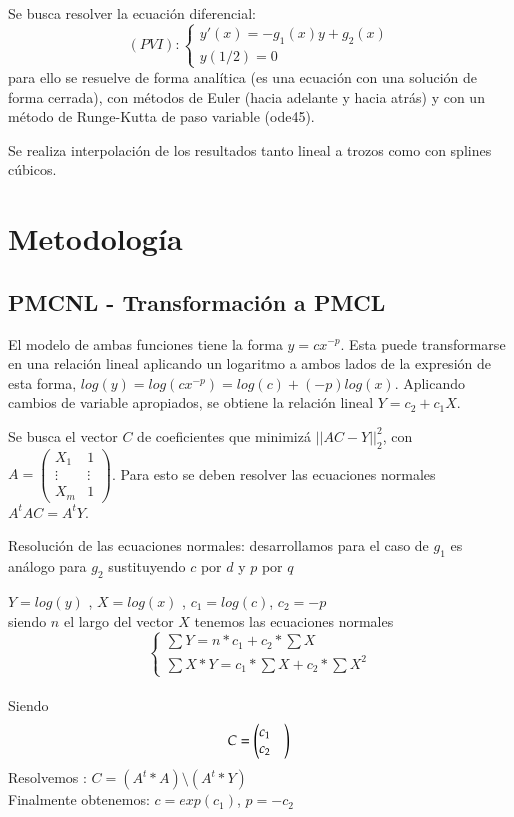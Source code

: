 \documentclass{endm}
\begin{document}
Se busca resolver la ecuación diferencial:
\begin{equation*}
    (PVI):\begin{cases}
        y'(x) = -g_1(x)y + g_2(x) \\
        y(1/2) = 0
    \end{cases}
\end{equation*}
para ello se resuelve de forma analítica (es una ecuación con una solución de forma cerrada), con métodos de Euler (hacia adelante y hacia atrás) y con un método de Runge-Kutta de paso variable (ode45).

Se realiza interpolación de los resultados tanto lineal a trozos como con splines cúbicos.
\section{Metodología}\label{AA}

\subsection{PMCNL - Transformación a PMCL}
El modelo de ambas funciones tiene la forma $y = cx^{-p}$. Esta puede transformarse en una relación
lineal aplicando un logaritmo a ambos lados de la expresión de esta forma, $log(y) = log(cx^{-p}) = log(c) + (-p)log(x)$.
Aplicando cambios de variable apropiados, se obtiene la relación lineal $Y = c_2 + c_1X$.

Se busca el vector $C$ de coeficientes que minimizá $||AC - Y||^2_2$,
con $A = \begin{pmatrix}X_1 & 1 \\ \vdots & \vdots \\ X_m & 1 \end{pmatrix}$.
Para esto se deben resolver las ecuaciones normales $A^tAC = A^tY$.

Resolución de las ecuaciones normales:
desarrollamos para el caso de $g_{1}$ es análogo para $g_{2}$ sustituyendo $c$ por $d$ y $p$ por $q$ 

$Y =log(y)$ , $X =log(x)$ , $c_1= log(c)$, $c_2= -p$ \\
siendo $n$ el largo del vector $X$ tenemos las ecuaciones normales
\begin{equation}
\begin{cases}
\sum Y = n * c_1 + c_2 * \sum X \\
\sum X * Y = c_1 * \sum X + c_2 * \sum X^2
\end{cases}
\end{equation}  \\
Siendo \begin{equation*}C=\begin{pmatrix}
          c_1 & \\
          c_2
         \end{pmatrix} \\
\end{equation*}
Resolvemos : $ C=(A^t * A) \setminus  (A^t * Y)$ \\
Finalmente obtenemos:  $c= exp(c_1)$, $p = -c_2$ \\
\end{document}
